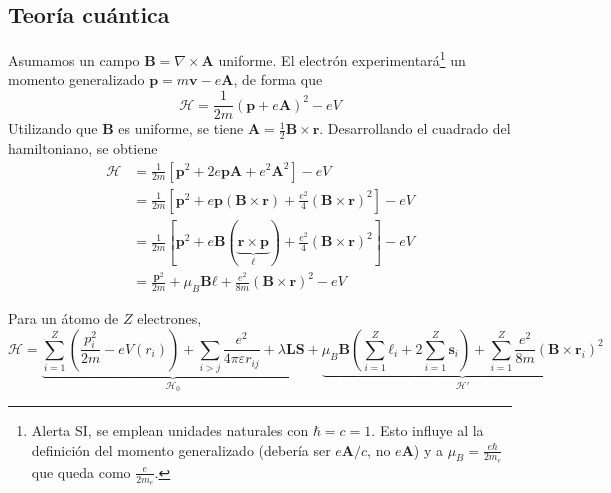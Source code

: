 \documentclass{tufte-book}
\newcommand{\Ham}{\mathscr{H}}
\newcommand{\sub}[1]{_{{\scriptscriptstyle\mathit{#1}}}}
\newcommand{\mb}{μ\sub{B}}
\begin{document}
\subsection{Teoría cuántica}
Asumamos un campo $\symbf{B} = \nabla × \symbf{A}$ uniforme.
El electrón experimentará\footnote{Alerta SI, se emplean unidades
  naturales con $ℏ=c=1$. Esto influye al la definición del momento
  generalizado (debería ser $e \symbf{A}/c$, no $e \symbf{A}$) y a
  $\mb = \frac{e ℏ}{2m_e}$ que queda como $\frac{e}{2m_e}$.}
un momento generalizado $\symbf{p} = m
\symbf{v} - e \symbf{A}$, de forma que
\begin{equation}
  \Ham = \frac{1}{2m} (\symbf{p} + e \symbf{A})^2 - e V
\end{equation}
Utilizando que $\symbf{B}$ es uniforme, se tiene $\symbf{A} =
\frac{1}{2} \symbf{B} × \symbf{r}$. Desarrollando el cuadrado del
hamiltoniano, se obtiene
\begin{equation}
  \begin{split}
    \Ham &= \frac{1}{2m} \left[ \symbf{p}^2 + 2e \symbf{p}\symbf{A}
      + e^2 \symbf{A}^2\right] - eV \\
    &=\frac{1}{2m} \left[ \symbf{p}^2 + e
      \symbf{p}(\symbf{B}×\symbf{r}) + \frac{e^2}{4}
      (\symbf{B}×\symbf{r})^2\right] - eV \\
    &=\frac{1}{2m} \left[ \symbf{p}^2 + e
      \symbf{B}(\underbrace{\symbf{r}×\symbf{p}}_{\symbf{ℓ}}) +
      \frac{e^2}{4} (\symbf{B}×\symbf{r})^2\right] - eV \\
    &= \frac{\symbf{p}^2}{2m} + \mb \symbf{B} \symbf{ℓ} +
    \frac{e^2}{8m} (\symbf{B}×\symbf{r})^2 - eV
  \end{split}
\end{equation}

Para un átomo de $Z$ electrones,
\begin{equation}
  \Ham =
  \underbrace{
    \sum_{i=1}^Z \left( \frac{p_i^2}{2m} - eV(r_i) \right) +
    \sum_{i>j} \frac{e^2}{4πεr_{ij}} + λ \symbf{L} \symbf{S}
  }_{\Ham_0}
  +
  \underbrace{
    \mb \symbf{B} \left( \sum_{i=1}^Z \symbf{ℓ}_i + 2
      \sum_{i=1}^Z \symbf{s}_i \right) + \sum_{i=1}^Z
    \frac{e^2}{8m}(\symbf{B}×\symbf{r}_i)^2
  }_{\Ham'}
\end{equation}
\end{document}
